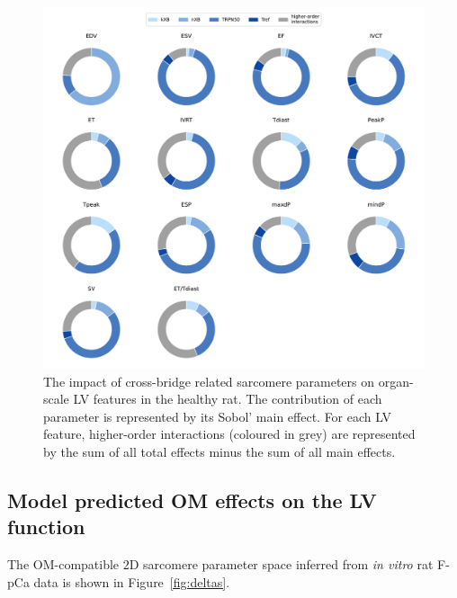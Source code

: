 \begin{figure}[ht!]
    \myfloatalign
    \includegraphics[width=\textwidth]{figures/chapter05/gsa_om.pdf}
    \caption{The impact of cross-bridge related sarcomere parameters on organ-scale LV features in the healthy rat. The contribution of each parameter is represented by its Sobol' main effect. For each LV feature, higher-order interactions (coloured in grey) are represented by the sum of all total effects minus the sum of all main effects.}
    \label{fig:omgsa}
\end{figure}



%
%
%
\subsection{Model predicted OM effects on the LV function}\label{sec:ch5model_predicted_om_effects_on_the_lv_function}
The OM-compatible $2$D sarcomere parameter space inferred from \textit{in vitro} rat F-pCa data is shown in Figure~\ref{fig:deltas}.

